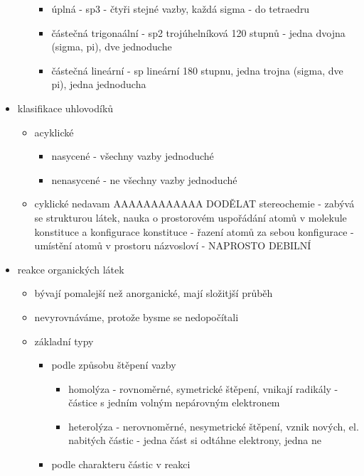 \documentclass{article}
\begin{document}
\begin{itemize}
\begin{itemize}
    \begin{itemize}
      \item úplná - sp3 - čtyři stejné vazby, každá sigma - do tetraedru
      \item částečná trigonaální - sp2 trojúhelníková 120 stupnů - jedna dvojna (sigma, pi), dve jednoduche
      \item částečná lineární - sp lineární 180 stupnu, jedna trojna (sigma, dve pi), jedna jednoducha
    \end{itemize}
\end{itemize}
  \item klasifikace uhlovodíků
  \begin{itemize}
    \item acyklické
    \begin{itemize}
      \item nasycené - všechny vazby jednoduché
      \item nenasycené - ne všechny vazby jednoduché
    \end{itemize}
    \item cyklické
    nedavam AAAAAAAAAAAA DODĚLAT
    stereochemie - zabývá se strukturou látek, nauka o prostorovém uspořádání atomů v molekule
    konstituce a konfigurace
      konstituce - řazení atomů za sebou
      konfigurace - umístění atomů v prostoru
    názvosloví - NAPROSTO DEBILNÍ
  \end{itemize}
  \item reakce organických látek
  \begin{itemize}
    \item bývají pomalejší než anorganické, mají složitjší průběh
    \item nevyrovnáváme, protože bysme se nedopočítali
    \item základní typy
    \begin{itemize}
      \item podle způsobu štěpení vazby
      \begin{itemize}
        \item homolýza - rovnoměrné, symetrické štěpení, vnikají radikály - částice s jedním volným nepárovným elektronem
        \item heterolýza - nerovnoměrné, nesymetrické štěpení, vznik nových, el. nabitých částic - jedna část si odtáhne elektrony, jedna ne
      \end{itemize}
      \item podle charakteru částic v reakci
      \begin{itemize}

\end{itemize}
\end{itemize}
\end{itemize}
\end{itemize}
\end{document}
